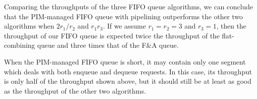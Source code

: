 Comparing the throughputs of the three FIFO queue algorithms, 
we can conclude that the PIM-managed FIFO queue with pipelining outperforms the other two algorithms 
when $2r_1 / r_2$ and $r_1 r_3$. 
If we assume $r_1 = r_2 = 3$ and $r_3 = 1$, then the throughput of our FIFO queue is expected 
twice the throughput of the flat-combining queue and three times that of the F\&A queue. 

When the PIM-managed FIFO queue is short, it may contain only one segment 
which deals with both enqueue and dequeue requests. 
In this case, its throughput is only half of the throughput shown above, 
but it should still be at least as good as the throughput of the other two algorithms. 

